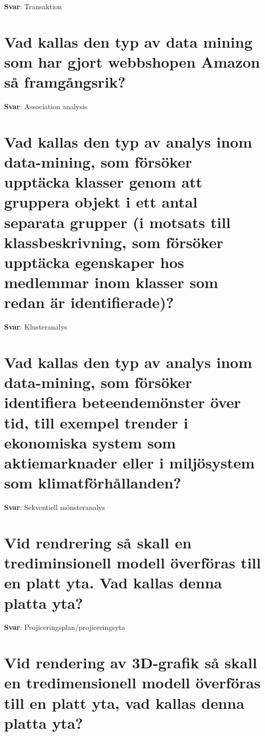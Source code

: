 \documentclass[a4paper,11pt,oneside]{book}
\begin{document}
\begin{sloppypar}
\label{q:55:sa:sv:True}

\textbf{Svar}: Transaktion



\section{Vad kallas den typ av data mining som har gjort webbshopen Amazon s\r{a} framg\r{a}ngsrik?}

\label{q:56:sa:sv:True}

\textbf{Svar}: Association analysis



\section{Vad kallas den typ av analys inom data-mining, som f\"ors\"oker uppt\"acka klasser genom att gruppera objekt i ett antal separata grupper (i motsats till klassbeskrivning, som f\"ors\"oker uppt\"acka egenskaper hos medlemmar inom klasser som redan \"ar identifierade)?}

\label{q:57:sa:sv:True}

\textbf{Svar}: Klusteranalys



\section{Vad kallas den typ av analys inom data-mining, som f\"ors\"oker identifiera beteendem\"onster \"over tid, till exempel trender i ekonomiska system som aktiemarknader eller i milj\"osystem som klimatf\"orh\r{a}llanden?}

\label{q:58:sa:sv:True}

\textbf{Svar}: Sekventiell m\"onsteranalys



\section{Vid rendrering s\r{a} skall en trediminsionell modell \"overf\"oras till en platt yta. Vad kallas denna platta yta?}

\label{q:59:sa:sv:True}

\textbf{Svar}: Projiceringsplan/projiceringsyta



\section{Vid rendering av 3D-grafik s\r{a} skall en tredimensionell modell \"overf\"oras till en platt yta, vad kallas denna platta yta?}


\end{sloppypar}
\end{document}
